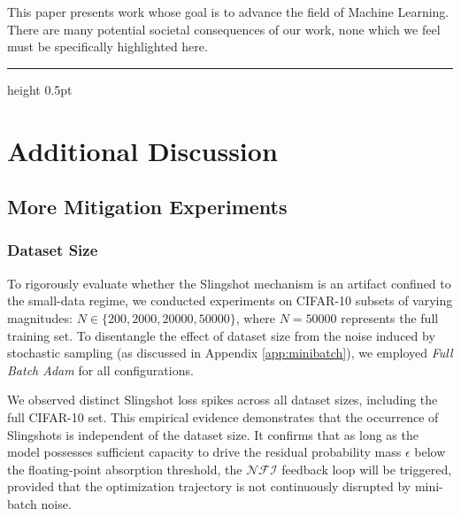 \documentclass{article}
\theoremstyle{plain}
\theoremstyle{definition}
\theoremstyle{remark}
\begin{document}
This paper presents work whose goal is to advance the field of Machine
Learning. There are many potential societal consequences of our work, none
which we feel must be specifically highlighted here.

\small{


}
\newpage
\appendix
{
\hypersetup{linkcolor=black}





\tableofcontents

\vspace{1em} \hrule height 0.5pt \vspace{2em} 
}
\section{Additional Discussion}

\subsection{More Mitigation Experiments}
\label{app:mitigation}

\subsubsection{Dataset Size}
To rigorously evaluate whether the Slingshot mechanism is an artifact confined to the small-data regime, we conducted experiments on CIFAR-10 subsets of varying magnitudes: $N \in \{200, 2000, 20000, 50000\}$, where $N=50000$ represents the full training set. 
To disentangle the effect of dataset size from the noise induced by stochastic sampling (as discussed in Appendix \ref{app:minibatch}), we employed \emph{Full Batch Adam} for all configurations.

We observed distinct Slingshot loss spikes across all dataset sizes, including the full CIFAR-10 set. 
This empirical evidence demonstrates that the occurrence of Slingshots is independent of the dataset size. 
It confirms that as long as the model possesses sufficient capacity to drive the residual probability mass $\epsilon$ below the floating-point absorption threshold, the $\mathcal{NFI}$ feedback loop will be triggered, provided that the optimization trajectory is not continuously disrupted by mini-batch noise.
\end{document}
